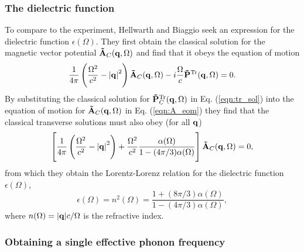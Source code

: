 \subsubsection{The dielectric function}
\label{subsubsec:2-3-3-4}

To compare to the experiment, Hellwarth and Biaggio seek an expression for the dielectric function $\epsilon(\Omega)$. They first obtain the classical solution for the magnetic vector potential $\vb{\Tilde{A}}_C(\vb{q}, \Omega)$ and find that it obeys the equation of motion 
\begin{equation}\label{eqn:A_eom}
    \frac{1}{4\pi} \left( \frac{\Omega^2}{c^2} - \abs{\vb{q}}^2 \right) \vb{\Tilde{A}}_C(\vb{q}, \Omega) - i \frac{\Omega}{c} \vb{\Tilde{P}}^{\text{Tr}}(\vb{q}, \Omega) = 0.
\end{equation}
By substituting the classical solution for $\vb{\Tilde{P}}^{\text{Tr}}_{C}(\vb{q}, \Omega)$ in Eq. (\ref{eqn:tr_sol}) into the equation of motion for $\vb{\Tilde{A}}_C(\vb{q}, \Omega)$ in Eq. (\ref{eqn:A_eom}) they find that the classical transverse solutions must also obey (for all $\vb{q}$)
\begin{equation}
    \left[ \frac{1}{4\pi} \left( \frac{\Omega^2}{c^2} - \abs{\vb{q}}^2 \right) + \frac{\Omega^2}{c^2} \frac{\alpha(\Omega)}{1 - (4\pi / 3) \alpha(\Omega)} \right] \vb{\Tilde{A}}_C(\vb{q}, \Omega) = 0,
\end{equation}
from which they obtain the Lorentz-Lorenz relation for the dielectric function $\epsilon(\Omega)$,
\begin{equation}
    \epsilon(\Omega) = n^2(\Omega) = \frac{1 + (8\pi/3)\alpha(\Omega)}{1 - (4\pi/3)\alpha(\Omega)},
\end{equation}
where $n(\Omega) = \abs{\vb{q}} c / \Omega$ is the refractive index.

\subsubsection{Obtaining a single effective phonon frequency}
\label{subsubsec:2-3-3-5}

